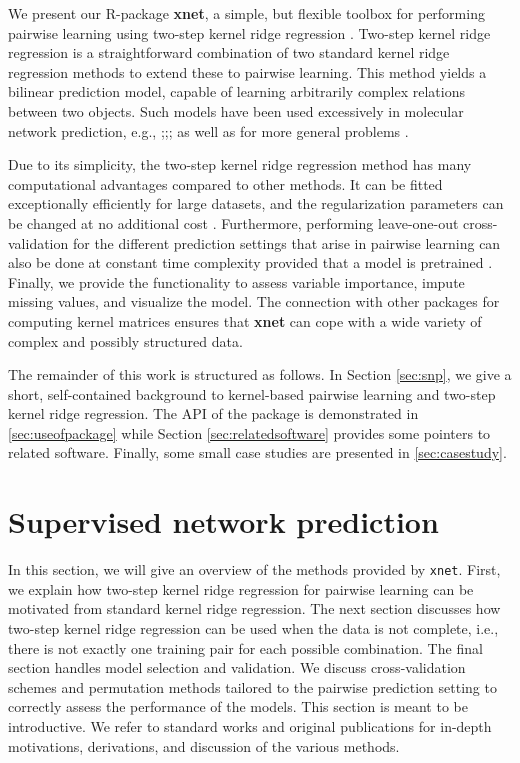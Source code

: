 \documentclass[
]{article}
\begin{document}
We present our R-package \textbf{xnet}, a simple, but flexible toolbox
for performing pairwise learning using two-step kernel ridge regression
\citep{Jung2013, Pahikkala2014a, Romera-paredes2015}. Two-step kernel
ridge regression is a straightforward combination of two standard kernel
ridge regression methods to extend these to pairwise learning. This
method yields a bilinear prediction model, capable of learning
arbitrarily complex relations between two objects. Such models have been
used excessively in molecular network prediction, e.g.,
\citet{Vert2007};\citet{VanLaarhoven2011a};\citet{Pahikkala2015};\citet{Pelossof2015}
as well as for more general problems
\citep{Brunner2012, Pahikkala2013a, Liu2015a}.

Due to its simplicity, the two-step kernel ridge regression method has
many computational advantages compared to other methods. It can be
fitted exceptionally efficiently for large datasets, and the
regularization parameters can be changed at no additional cost
\citep{Stock2017tskrr}. Furthermore, performing leave-one-out
cross-validation for the different prediction settings that arise in
pairwise learning can also be done at constant time complexity provided
that a model is pretrained \citep{Stock2017tskrr}. Finally, we provide
the functionality to assess variable importance, impute missing values,
and visualize the model. The connection with other packages for
computing kernel matrices ensures that \textbf{xnet} can cope with a
wide variety of complex and possibly structured data.

The remainder of this work is structured as follows. In Section
\ref{sec:snp}, we give a short, self-contained background to
kernel-based pairwise learning and two-step kernel ridge regression. The
API of the package is demonstrated in \ref{sec:useofpackage} while
Section \ref{sec:relatedsoftware} provides some pointers to related
software. Finally, some small case studies are presented in
\ref{sec:casestudy}.

\hypertarget{supervised-network-prediction}{%
\section{Supervised network
prediction}\label{supervised-network-prediction}}

\label{sec:snp}

In this section, we will give an overview of the methods provided by
\texttt{xnet}. First, we explain how two-step kernel ridge regression
for pairwise learning can be motivated from standard kernel ridge
regression. The next section discusses how two-step kernel ridge
regression can be used when the data is not complete, i.e., there is not
exactly one training pair for each possible combination. The final
section handles model selection and validation. We discuss
cross-validation schemes and permutation methods tailored to the
pairwise prediction setting to correctly assess the performance of the
models. This section is meant to be introductive. We refer to standard
works and original publications for in-depth motivations, derivations,
and discussion of the various methods.
\end{document}
